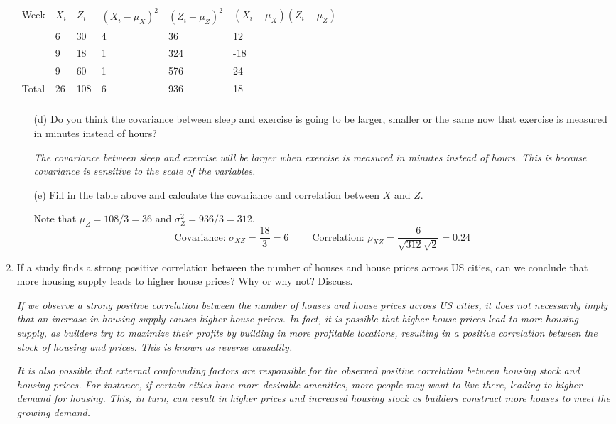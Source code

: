 \documentclass{./../../Latex/handout}
\begin{document}
\begin{enumerate}
\begin{tabularx}{\textwidth}{P{1cm}P{1cm}P{1.5cm}P{2.5cm}P{2.5cm}Y}
\hline \addlinespace[0.5em]
Week & $X_i$ & $Z_i$ & $(X_i-\mu_X)^2$ & $(Z_i-\mu_Z)^2$ & $(X_i-\mu_X)(Z_i-\mu_Z)$  \\ \addlinespace[0.5em] \hline {} & 6 & 30   	& 4  & 36 & 12  \\ \hline {} & 9 & 18   	& 1  & 324 & -18 \\ \hline {} & 9 & 60   	& 1  & 576 &  24 \\ \hline \addlinespace[0.5em]
Total & 26 & 108 & 6 & 936  & 18 \\ \hline \addlinespace[0.5em]
\end{tabularx}
\begin{enumerate}
\item[(d)] Do you think the covariance between sleep and exercise is going to be larger, smaller or the same now that exercise is measured in minutes instead of hours? 
\item[] \textit{The covariance between sleep and exercise will be larger when exercise is measured in minutes instead of hours. This is because covariance is sensitive to the scale of the variables.}
\item[(e)] Fill in the table above and calculate the covariance and correlation between $X$ and $Z$. \\
\item[] Note that $\mu_Z = 108/3 = 36$ and $\sigma^2_Z = 936/3 = 312.$
$$ \text{Covariance: } \sigma_{XZ} = \frac{18}{3} = 6  \hspace{1cm} \text{Correlation: }\rho_{XZ} = \frac{6}{\sqrt{312} \sqrt{2}}= 0.24 $$
\end{enumerate}
\vspace{4cm}

\item If a study finds a strong positive correlation between the number
of houses and house prices across US cities, can we conclude that
more housing supply leads to higher house prices? Why or why not? Discuss.

\item[] \textit{If we observe a strong positive correlation between the number of houses and house prices across US cities, it does not necessarily imply that an increase in housing supply causes higher house prices. In fact, it is possible that higher house prices lead to more housing supply, as builders try to maximize their profits by building in more profitable locations, resulting in a positive correlation between the stock of housing and prices. This is known as reverse causality.}

\textit{It is also possible that external confounding factors are responsible for the observed positive correlation between housing stock and housing prices. For instance, if certain cities have more desirable amenities, more people may want to live there, leading to higher demand for housing. This, in turn, can result in higher prices and increased housing stock as builders construct more houses to meet the growing demand. }
\end{enumerate}
\end{document}
